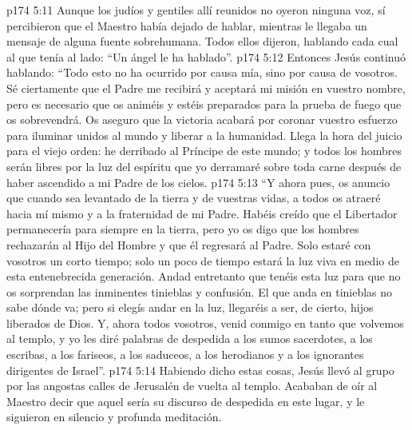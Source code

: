 \vs p174 5:11 Aunque los judíos y gentiles allí reunidos no oyeron ninguna voz, sí percibieron que el Maestro había dejado de hablar, mientras le llegaba un mensaje de alguna fuente sobrehumana. Todos ellos dijeron, hablando cada cual al que tenía al lado: “Un ángel le ha hablado”.
\vs p174 5:12 Entonces Jesús continuó hablando: “Todo esto no ha ocurrido por causa mía, sino por causa de vosotros. Sé ciertamente que el Padre me recibirá y aceptará mi misión en vuestro nombre, pero es necesario que os animéis y estéis preparados para la prueba de fuego que os sobrevendrá. Os aseguro que la victoria acabará por coronar vuestro esfuerzo para iluminar unidos al mundo y liberar a la humanidad. Llega la hora del juicio para el viejo orden: he derribado al Príncipe de este mundo; y todos los hombres serán libres por la luz del espíritu que yo derramaré sobre toda carne después de haber ascendido a mi Padre de los cielos.
\vs p174 5:13 “Y ahora pues, os anuncio que cuando sea levantado de la tierra y de vuestras vidas, a todos os atraeré hacia mí mismo y a la fraternidad de mi Padre. Habéis creído que el Libertador permanecería para siempre en la tierra, pero yo os digo que los hombres rechazarán al Hijo del Hombre y que él regresará al Padre. Solo estaré con vosotros un corto tiempo; solo un poco de tiempo estará la luz viva en medio de esta entenebrecida generación. Andad entretanto que tenéis esta luz para que no os sorprendan las inminentes tinieblas y confusión. El que anda en tinieblas no sabe dónde va; pero si elegís andar en la luz, llegaréis a ser, de cierto, hijos liberados de Dios. Y, ahora todos vosotros, venid conmigo en tanto que volvemos al templo, y yo les diré palabras de despedida a los sumos sacerdotes, a los escribas, a los fariseos, a los saduceos, a los herodianos y a los ignorantes dirigentes de Israel”.
\vs p174 5:14 Habiendo dicho estas cosas, Jesús llevó al grupo por las angostas calles de Jerusalén de vuelta al templo. Acababan de oír al Maestro decir que aquel sería su discurso de despedida en este lugar, y le siguieron en silencio y profunda meditación.
